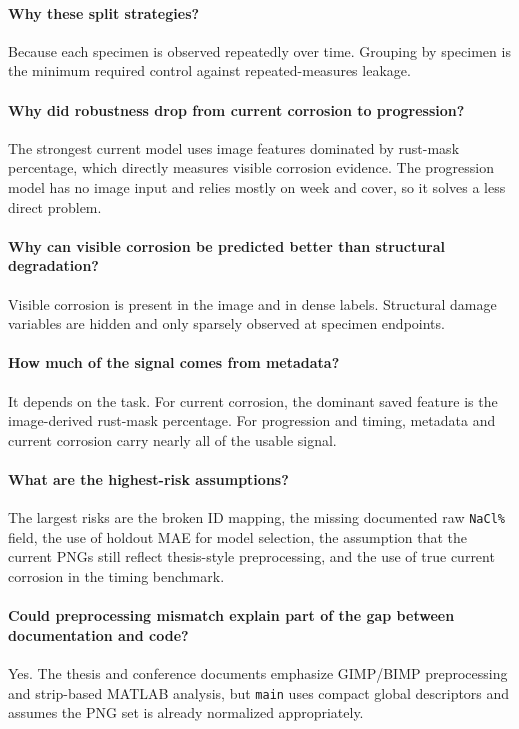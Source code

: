 \documentclass[11pt]{article}
\begin{document}
\paragraph{Why these split strategies?}
Because each specimen is observed repeatedly over time. Grouping by specimen is the minimum required control against repeated-measures leakage.

\paragraph{Why did robustness drop from current corrosion to progression?}
The strongest current model uses image features dominated by rust-mask percentage, which directly measures visible corrosion evidence. The progression model has no image input and relies mostly on week and cover, so it solves a less direct problem.

\paragraph{Why can visible corrosion be predicted better than structural degradation?}
Visible corrosion is present in the image and in dense labels. Structural damage variables are hidden and only sparsely observed at specimen endpoints.

\paragraph{How much of the signal comes from metadata?}
It depends on the task. For current corrosion, the dominant saved feature is the image-derived rust-mask percentage. For progression and timing, metadata and current corrosion carry nearly all of the usable signal.

\paragraph{What are the highest-risk assumptions?}
The largest risks are the broken ID mapping, the missing documented raw \texttt{NaCl\%} field, the use of holdout MAE for model selection, the assumption that the current PNGs still reflect thesis-style preprocessing, and the use of true current corrosion in the timing benchmark.

\paragraph{Could preprocessing mismatch explain part of the gap between documentation and code?}
Yes. The thesis and conference documents emphasize GIMP/BIMP preprocessing and strip-based MATLAB analysis, but \texttt{main} uses compact global descriptors and assumes the PNG set is already normalized appropriately.
\end{document}
